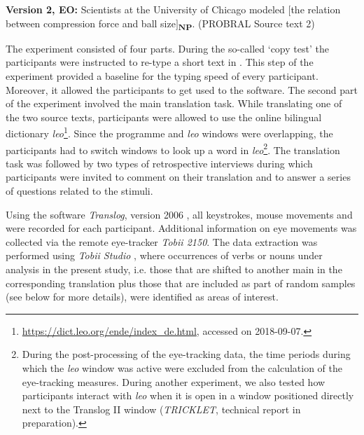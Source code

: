 \documentclass[output=paper]{LSP/langsci}
\begin{document}
\ea \label{serbinaetal:ex:3}
\textbf{Version 2, EO:} Scientists at the University of Chicago modeled $[$the relation between compression force and ball size$]$\textsubscript{\textbf{NP}}.  (PROBRAL Source text 2)
\z

The experiment consisted of four parts. During the so-called `copy test' the participants were instructed to re-type a short text in . This step of the experiment provided a baseline for the typing speed of every participant. Moreover, it allowed the participants to get used to the  software. The second part of the experiment involved the main translation task. While translating one of the two source texts, participants were allowed to use the online bilingual dictionary \textit{leo}\footnote{\url{https://dict.leo.org/ende/index_de.html}, accessed on 2018-09-07.}. Since the  programme and \textit{leo} windows were overlapping, the participants had to switch windows to look up a word in \textit{leo}\footnote{During the post-processing of the eye-tracking data, the time periods during which the \textit{leo} window was active were excluded from the calculation of the eye-tracking measures. During another experiment, we also tested how participants interact with \textit{leo} when it is open in a window positioned directly next to the Translog II window (\textit{TRICKLET}, technical report in preparation).}. The translation task was followed by two types of retrospective interviews during which participants were invited to comment on their translation and to answer a series of questions related to the stimuli. 

Using the  software \textit{Translog}, version 2006 \citep{Jakobsen1999TranslogDoc}, all keystrokes, mouse movements and  were recorded for each participant. Additional information on eye movements was collected via the remote eye-tracker \textit{Tobii 2150}. The data extraction was performed using \textit{Tobii Studio} \citep{Tobii2012}, where occurrences of verbs or nouns under analysis in the present study, i.e. those that are shifted to another main  in the corresponding translation plus those that are included as part of random samples (see below for more details), were identified as areas of interest.
\end{document}
